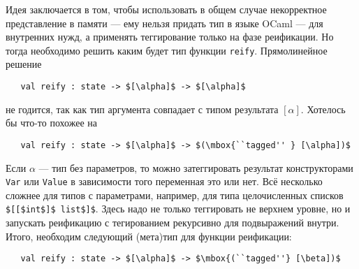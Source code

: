 Идея заключается в том, чтобы использовать в общем случае некорректное представление в памяти --- ему нельзя придать тип в языке OCaml --- для внутренних нужд, а применять теггирование только на фазе реификации. Но тогда необходимо решить каким будет тип функции \lstinline|reify|.
Прямолинейное решение


\begin{lstlisting}
   val reify : state -> $[\alpha]$ -> $[\alpha]$
\end{lstlisting}

не годится, так как тип аргумента совпадает с типом результата $[\alpha]$. Хотелось бы что-то похожее на


\begin{lstlisting}
   val reify : state -> $[\alpha]$ -> $(\mbox{``tagged'' } [\alpha])$
\end{lstlisting}

Если $\alpha$ --- тип без параметров, то можно затеггировать результат конструкторами \lstinline|Var| или \lstinline|Value|  в зависимости того переменная это или нет.
Всё несколько сложнее для типов с параметрами, например, для типа целочисленных списков \lstinline|$[[$int$]$ list$]$|.
Здесь надо не только теггировать не верхнем уровне, но и запускать реификацию с тегированием рекурсивно для подвыражений внутри.
Итого, необходим следующий (мета)тип для функции реификации:


\begin{lstlisting}
   val reify : state -> $[\alpha]$ -> $\mbox{(``tagged''} [\beta])$
\end{lstlisting}

